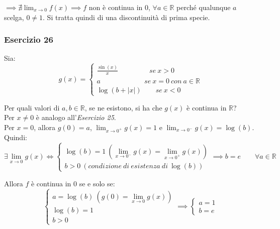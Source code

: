 \documentclass{article}
\begin{document}
\noindent $\implies \nexists \lim_{x \to 0} f(x) \implies f$ non è continua in $0$, $\forall a \in \mathbb{R}$ perché qualunque $a$ scelga, $0 \neq 1$. Si tratta quindi di una discontinuità di prima specie.

\subsubsection{Esercizio 26}
Sia:
\begin{equation*}
    g(x) = \begin{cases}
        \frac{\sin(x)}{x} \qquad \qquad \ \ se \ x > 0 \\
        a \qquad \qquad \qquad \ se \ x = 0 \ con \ a \in \mathbb{R} \\
        \log(b + |x|) \qquad se \ x < 0
    \end{cases}
\end{equation*}

\noindent Per quali valori di $a, b \in \mathbb{R}$, se ne esistono, si ha che $g(x)$ è continua in $\mathbb{R}$?\\

\noindent Per $x \neq 0$ è analogo all'\textit{Esercizio 25}. \\
\noindent Per $x = 0$, allora $g(0) = a$, $\lim_{x \to 0^+} g(x) = 1$ e $\lim_{x \to 0^-} g(x) = \log(b)$. Quindi:
\begin{equation*}
    \exists \lim_{x \to 0} g(x) \iff \begin{cases}
        \log(b) = 1 \ (\lim_{x \to 0^-} g(x) = \lim_{x \to 0^+} g(x)) \\
        b > 0 \ (condizione \ di \ esistenza \ di \ \log(b))
    \end{cases}
    \implies b = e \qquad \forall a \in \mathbb{R}
\end{equation*}

\noindent Allora $f$ è continua in $0$ se e solo se:
\begin{equation*}
    \begin{cases}
        a = \log(b) \ (g(0) = \lim_{x \to 0} g(x)) \\ 
        \log(b) = 1 \\
        b > 0
    \end{cases}
    \implies
    \begin{cases}
        a = 1 \\
        b = e
    \end{cases}
\end{equation*}
\end{document}
